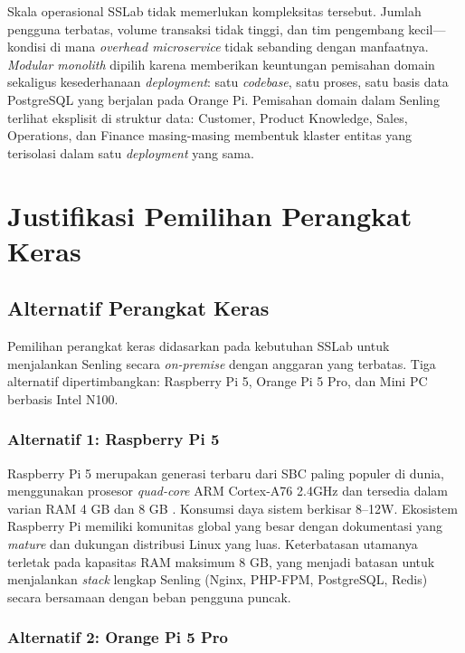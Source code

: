 Skala operasional SSLab tidak memerlukan kompleksitas tersebut. Jumlah pengguna terbatas, volume transaksi tidak tinggi, dan tim pengembang kecil—kondisi di mana \textit{overhead microservice} tidak sebanding dengan manfaatnya. \textit{Modular monolith} dipilih karena memberikan keuntungan pemisahan domain sekaligus kesederhanaan \textit{deployment}: satu \textit{codebase}, satu proses, satu basis data PostgreSQL yang berjalan pada Orange Pi. Pemisahan domain dalam Senling terlihat eksplisit di struktur data: Customer, Product Knowledge, Sales, Operations, dan Finance masing-masing membentuk klaster entitas yang terisolasi dalam satu \textit{deployment} yang sama.


\section{Justifikasi Pemilihan Perangkat Keras}

\subsection{Alternatif Perangkat Keras}

Pemilihan perangkat keras didasarkan pada kebutuhan SSLab untuk menjalankan Senling secara \textit{on-premise} dengan anggaran yang terbatas. Tiga alternatif dipertimbangkan: Raspberry Pi 5, Orange Pi 5 Pro, dan Mini PC berbasis Intel N100.

\subsubsection{Alternatif 1: Raspberry Pi 5}

Raspberry Pi 5 merupakan generasi terbaru dari SBC paling populer di dunia, menggunakan prosesor \textit{quad-core} ARM Cortex-A76 2.4GHz dan tersedia dalam varian RAM 4 GB dan 8 GB \cite{raspberrypi2024pi5}. Konsumsi daya sistem berkisar 8--12W. Ekosistem Raspberry Pi memiliki komunitas global yang besar dengan dokumentasi yang \textit{mature} dan dukungan distribusi Linux yang luas. Keterbatasan utamanya terletak pada kapasitas RAM maksimum 8 GB, yang menjadi batasan untuk menjalankan \textit{stack} lengkap Senling (Nginx, PHP-FPM, PostgreSQL, Redis) secara bersamaan dengan beban pengguna puncak.

\subsubsection{Alternatif 2: Orange Pi 5 Pro}

